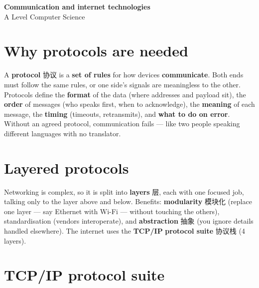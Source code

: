 \documentclass[11pt]{article}
\begin{document}
\begin{center}
  {\LARGE\bfseries Communication and internet technologies}\\[0.35em]
  {\large A Level Computer Science}
\end{center}
\vspace{0.6em}

\section*{Why protocols are needed}

A \textbf{protocol} 协议 is a \textbf{set of rules} for how devices \textbf{communicate}. Both ends must follow the same rules, or one side's signals are meaningless to the other. Protocols define the \textbf{format} of the data (where addresses and payload sit), the \textbf{order} of messages (who speaks first, when to acknowledge), the \textbf{meaning} of each message, the \textbf{timing} (timeouts, retransmits), and \textbf{what to do on error}. Without an agreed protocol, communication fails — like two people speaking different languages with no translator.

\section*{Layered protocols}

Networking is complex, so it is split into \textbf{layers} 层, each with one focused job, talking only to the layer above and below. Benefits: \textbf{modularity} 模块化 (replace one layer — say Ethernet with Wi-Fi — without touching the others), standardisation (vendors interoperate), and \textbf{abstraction} 抽象 (you ignore details handled elsewhere). The internet uses the \textbf{TCP/IP} \textbf{protocol suite} 协议栈 (4 layers).

\section*{TCP/IP protocol suite}

\begin{center}
\end{center}
\end{document}
